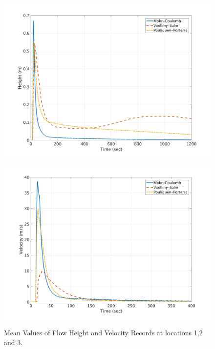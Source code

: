 \documentclass[a4paper,10pt]{article}
\begin{document}
\begin{figure}[H]
	\begin{minipage}[b]{0.5\linewidth}
	\centering
    \includegraphics[width=1\textwidth]{HeightMeans/H3All.png}     
        \label{fig:MFHR_L3}
	\end{minipage}
	\begin{minipage}[b]{0.5\linewidth}
	\centering
    \includegraphics[width=1\textwidth]{VelocityMeans/V3All.png}
        \label{fig:MFVR_L3}
	\end{minipage}
	
	\caption{Mean Values of Flow Height and Velocity Records at locations 1,2 and 3.}\label{fig:MFHVR_L123}	
\end{figure}
\end{document}
